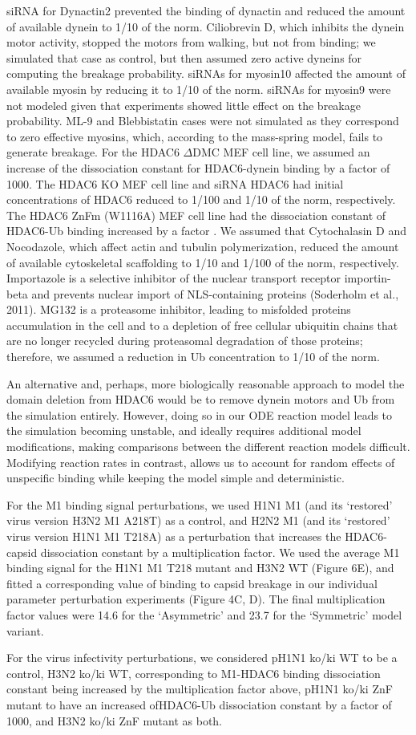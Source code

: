 siRNA for Dynactin2 prevented the binding of dynactin and reduced the amount of available dynein to 1/10 of the norm. Ciliobrevin D, which inhibits the dynein motor activity, stopped the motors from walking, but not from binding; we simulated that case as control, but then assumed zero active dyneins for computing the breakage probability. siRNAs for myosin10 affected the amount of available myosin by reducing it to 1/10 of the norm. siRNAs for myosin9 were not modeled given that experiments showed little effect on the breakage probability. ML-9 and Blebbistatin cases were not simulated as they correspond to zero effective myosins, which, according to the mass-spring model, fails to generate breakage. For the HDAC6 $\Delta$DMC MEF cell line, we assumed an increase of the dissociation constant for HDAC6-dynein binding by a factor of 1000. The HDAC6 KO MEF cell line and siRNA HDAC6 had initial concentrations of HDAC6 reduced to 1/100 and 1/10 of the norm, respectively. The HDAC6 ZnFm (W1116A) MEF cell line had the dissociation constant of HDAC6-Ub binding increased by a factor  . We assumed that Cytochalasin D and Nocodazole, which affect actin and tubulin polymerization, reduced the amount of available cytoskeletal scaffolding to 1/10 and 1/100 of the norm, respectively. Importazole is a selective inhibitor of the nuclear transport receptor importin-beta and prevents nuclear import of NLS-containing proteins (Soderholm et al., 2011). MG132 is a proteasome inhibitor, leading to misfolded proteins accumulation in the cell and to a depletion of free cellular ubiquitin chains that are no longer recycled during proteasomal degradation of those proteins; therefore, we assumed a reduction in Ub concentration to 1/10 of the norm.

An alternative and, perhaps, more biologically reasonable approach to model the domain deletion from HDAC6 would be to remove dynein motors and Ub from the simulation entirely. However, doing so in our ODE reaction model leads to the simulation becoming unstable, and ideally requires additional model modifications, making comparisons between the different reaction models difficult. Modifying reaction rates in contrast, allows us to account for random effects of unspecific binding while keeping the model simple and deterministic.

For the M1 binding signal perturbations, we used H1N1 M1 (and its ‘restored’ virus version H3N2 M1 A218T) as a control, and H2N2 M1 (and its ‘restored’ virus version H1N1 M1 T218A) as a perturbation that increases the HDAC6-capsid dissociation constant by a multiplication factor. We used the average M1 binding signal for the H1N1 M1 T218 mutant and H3N2 WT (Figure 6E), and fitted a corresponding value of binding to capsid breakage in our individual parameter perturbation experiments (Figure 4C, D). The final multiplication factor values were 14.6 for the ‘Asymmetric’ and 23.7 for the ‘Symmetric’ model variant.

For the virus infectivity perturbations, we considered pH1N1 ko/ki WT to be a control, H3N2 ko/ki WT, corresponding to M1-HDAC6 binding dissociation constant being increased by the multiplication factor above, pH1N1 ko/ki ZnF mutant to have an increased ofHDAC6-Ub dissociation constant by a factor of 1000, and H3N2 ko/ki ZnF mutant as both.
